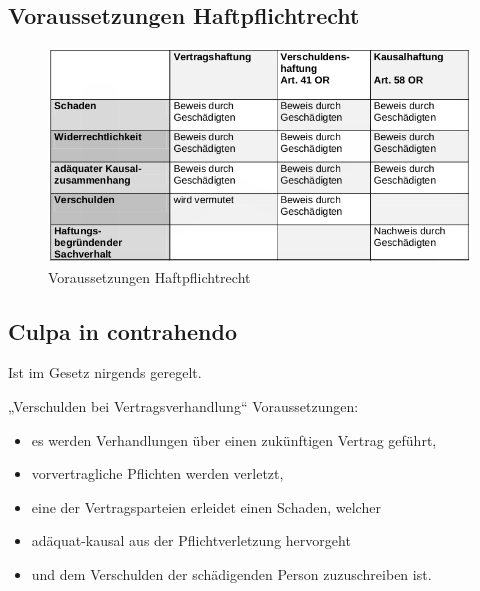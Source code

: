 \hypertarget{voraussetzungen-haftpflichtrecht}{%
\subsection{Voraussetzungen
Haftpflichtrecht}\label{voraussetzungen-haftpflichtrecht}}

\begin{figure}
\centering
\includegraphics{figures/Voraussetzungen_Haftpflichtrecht.png}
\caption{Voraussetzungen Haftpflichtrecht}
\end{figure}

\hypertarget{culpa-in-contrahendo}{%
\subsection{Culpa in contrahendo}\label{culpa-in-contrahendo}}

Ist im Gesetz nirgends geregelt.

„Verschulden bei Vertragsverhandlung`` Voraussetzungen:

\begin{itemize}
\tightlist
\item
  es werden Verhandlungen über einen zukünftigen Vertrag geführt,
\item
  vorvertragliche Pflichten werden verletzt,
\item
  eine der Vertragsparteien erleidet einen Schaden, welcher
\item
  adäquat-kausal aus der Pflichtverletzung hervorgeht
\item
  und dem Verschulden der schädigenden Person zuzuschreiben ist.
\end{itemize}
